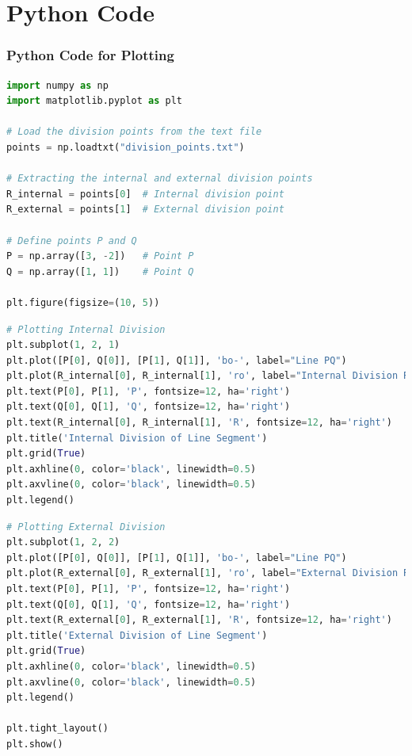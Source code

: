 \documentclass{beamer}
\theoremstyle{remark}
\numberwithin{equation}{section}
\begin{document}
\section{Python Code}
\begin{frame}[fragile]
\frametitle{Python Code for Plotting}
\begin{lstlisting}[language=Python]
import numpy as np
import matplotlib.pyplot as plt

# Load the division points from the text file
points = np.loadtxt("division_points.txt")

# Extracting the internal and external division points
R_internal = points[0]  # Internal division point
R_external = points[1]  # External division point

# Define points P and Q
P = np.array([3, -2])   # Point P
Q = np.array([1, 1])    # Point Q

plt.figure(figsize=(10, 5))
\end{lstlisting}
\end{frame}
\begin{frame}[fragile]
\begin{lstlisting}[language=Python]
# Plotting Internal Division
plt.subplot(1, 2, 1)
plt.plot([P[0], Q[0]], [P[1], Q[1]], 'bo-', label="Line PQ")
plt.plot(R_internal[0], R_internal[1], 'ro', label="Internal Division R")
plt.text(P[0], P[1], 'P', fontsize=12, ha='right')
plt.text(Q[0], Q[1], 'Q', fontsize=12, ha='right')
plt.text(R_internal[0], R_internal[1], 'R', fontsize=12, ha='right')
plt.title('Internal Division of Line Segment')
plt.grid(True)
plt.axhline(0, color='black', linewidth=0.5)
plt.axvline(0, color='black', linewidth=0.5)
plt.legend()
\end{lstlisting}
\end{frame}
\begin{frame}[fragile]
\begin{lstlisting}[language=Python]
# Plotting External Division
plt.subplot(1, 2, 2)
plt.plot([P[0], Q[0]], [P[1], Q[1]], 'bo-', label="Line PQ")
plt.plot(R_external[0], R_external[1], 'ro', label="External Division R")
plt.text(P[0], P[1], 'P', fontsize=12, ha='right')
plt.text(Q[0], Q[1], 'Q', fontsize=12, ha='right')
plt.text(R_external[0], R_external[1], 'R', fontsize=12, ha='right')
plt.title('External Division of Line Segment')
plt.grid(True)
plt.axhline(0, color='black', linewidth=0.5)
plt.axvline(0, color='black', linewidth=0.5)
plt.legend()

plt.tight_layout()
plt.show()

\end{lstlisting}
\end{frame}
\end{document}
